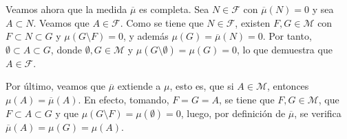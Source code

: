 \documentclass[11pt]{report}
\newcommand{\F}{\mathcal F}
\newcommand{\M}{\mathcal M}
\begin{document}
\begin{itemize}
    Veamos ahora que la medida $\overline{\mu}$ es completa. Sea $N \in \F$ con $\overline{\mu}(N)=0$ y sea $A \subset N$. Veamos que $A \in \F$. Como se tiene que $N \in \F$, existen $F,G \in \M$ con $F \subset N \subset G$ y $\mu(G \setminus F) = 0$, y además $\mu(G) = \overline{\mu}(N)=0$. Por tanto, $\emptyset \subset A \subset G$, donde $\emptyset, G \in \M$ y $\mu(G \setminus \emptyset) = \mu(G) = 0$, lo que demuestra que $A \in \F$.

    \vspace{2mm}

    Por último, veamos que $\overline{\mu}$ extiende a $\mu$, esto es, que si $A \in \M$, entonces $\mu(A)=\overline{\mu}(A)$. En efecto, tomando, $F=G=A$, se tiene que $F,G \in \M$, que $F \subset A \subset G$ y que $\mu(G \setminus F) = \mu(\emptyset) = 0$, luego, por definición de $\overline{\mu}$, se verifica $\overline{\mu}(A) = \mu(G) = \mu(A)$.
    
\end{itemize}
\end{document}

